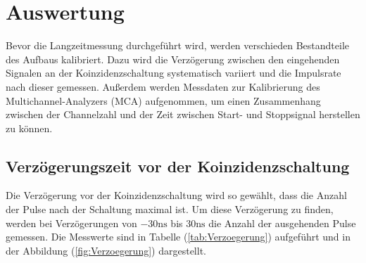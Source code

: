 \section{Auswertung}
\label{sec:Auswertung}
Bevor die Langzeitmessung durchgeführt wird, werden verschieden
Bestandteile des Aufbaus kalibriert. Dazu wird die Verzögerung 
zwischen den eingehenden Signalen an der Koinzidenzschaltung 
systematisch variiert und die Impulsrate nach dieser gemessen. 
Außerdem werden Messdaten zur Kalibrierung des Multichannel-Analyzers 
(MCA) aufgenommen, um einen Zusammenhang zwischen der Channelzahl und 
der Zeit zwischen Start- und Stoppsignal herstellen zu können.

\subsection{Verzögerungszeit vor der Koinzidenzschaltung}
Die Verzögerung vor der Koinzidenzschaltung wird so gewählt, dass die 
Anzahl der Pulse nach der Schaltung maximal ist. Um diese Verzögerung 
zu finden, werden bei Verzögerungen von $-30 \unit{\nano\second}$ bis 
$30 \unit{\nano\second}$ die Anzahl der ausgehenden Pulse gemessen. 
Die Messwerte sind in Tabelle (\ref{tab:Verzoegerung}) aufgeführt 
und in der Abbildung (\ref{fig:Verzoegerung}) dargestellt. 



